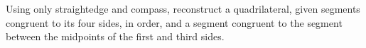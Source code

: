Using only straightedge and compass,
reconstruct a quadrilateral,
given segments congruent to its four sides, in order,
and a segment congruent to the segment between the midpoints of the first and third sides.

